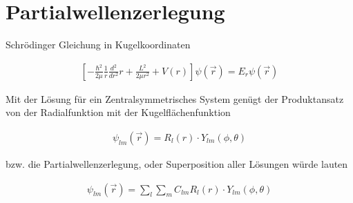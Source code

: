 
\usepackage{amsmath}                %
\usepackage{amsfonts}



\section*{Partialwellenzerlegung}


Schrödinger Gleichung in Kugelkoordinaten




\begin{align}
  \label{eq:2}
    \left[-\frac{\hbar^2}{2\mu}\frac{1}{r}\frac{d^2}{dr^2}r + \frac{L^2}{2\mu r^2}  + V(r) \right]\psi(\vec r) = E_r\psi(\vec r) 
\end{align}

Mit der Lösung für ein Zentralsymmetrisches System genügt der Produktansatz von der Radialfunktion mit der Kugelflächenfunktion

\begin{align}
  \label{eq:3}
  \psi_{lm}(\vec r) = R_{l}(r)\cdot Y_{lm}(\phi,\theta) 
\end{align}

bzw. die Partialwellenzerlegung, oder Superposition aller Lösungen würde lauten

\begin{align}
  \label{eq:4}
  \psi_{lm}(\vec r) = \sum_l\sum_m C_{lm} R_{l}(r)\cdot Y_{lm}(\phi,\theta) 
\end{align}




